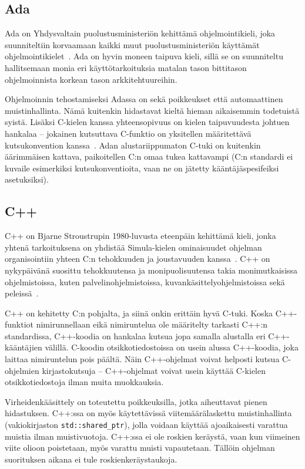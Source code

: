 \subsection{Ada}

Ada on Yhdysvaltain puolustusministeriön kehittämä ohjelmointikieli, joka
suunniteltiin korvaamaan kaikki muut puolustusministeriön käyttämät
ohjelmointikielet~\citep{adahistory}. Ada on hyvin moneen taipuva kieli, sillä
se on suunniteltu hallitsemaan monia eri käyttötarkoituksia matalan tason
bittitason ohjelmoinnista korkean tason arkkitehtuureihin.

Ohjelmoinnin tehostamiseksi Adassa on sekä poikkeukset että automaattinen
muistinhallinta. Nämä kuitenkin hidastavat kieltä hieman aikaisemmin todetuistä
syistä. Lisäksi C-kielen kanssa yhteensopivuus on kielen taipuvuudesta johtuen
hankalaa -- jokainen kutsuttava C-funktio on yksitellen määritettävä
kutsukonvention kanssa~\citep[s.~471]{ADA12}. Adan
alustariippumaton C-tuki on kuitenkin äärimmäisen kattava, paikoitellen C:n
omaa tukea kattavampi (C:n standardi ei kuvaile esimerkiksi kutsukonventioita,
vaan ne on jätetty kääntäjäspesifeiksi asetuksiksi).

\subsection{C++}

C++ on Bjarne Stroustrupin 1980-luvusta eteenpäin kehittämä kieli, jonka
yhtenä tarkoituksena on yhdistää Simula-kielen ominaisuudet ohjelman
organisointiin yhteen C:n tehokkuuden ja joustavuuden
kanssa~\citep{cpphistory}. C++ on nykypäivänä suosittu tehokkuutensa ja
monipuolisuutensa takia monimutkaisissa ohjelmistoissa, kuten
palvelinohjelmistoissa, kuvankäsittelyohjelmistoissa sekä
peleissä~\citep{cppapps}.

C++ on kehitetty C:n pohjalta, ja siinä onkin erittäin hyvä C-tuki. Koska
C++\hyp{}funktiot nimirunnellaan eikä nimiruntelua ole määritelty tarkasti C++:n
standardissa, C++-koodia on hankalaa kutsua jopa samalla alustalla eri
C++-kääntäjien välillä. C-koodin otsikkotiedostoissa on
usein alussa C++-koodia, joka laittaa nimiruntelun pois päältä. Näin
C++-ohjelmat voivat helposti kutsua C-ohjelmien kirjastokutsuja -- C++-ohjelmat
voivat usein käyttää C-kielen otsikkotiedostoja ilman muita muokkauksia.

Virheidenkääsittely on toteutettu poikkeuksilla, jotka aiheuttavat pienen
hidastuksen. C++:ssa on myös käytettävissä viitemäärälaskettu muistinhallinta (vakiokirjaston \texttt{std::shared\_ptr}), jolla
voidaan käyttää ajoaikaisesti varattua muistia ilman muistivuotoja. C++:ssa ei
ole roskien keräystä, vaan kun viimeinen viite olioon poistetaan, myös varattu
muisti vapautetaan. Tällöin ohjelman suorituksen aikana ei tule
roskienkeräystaukoja.

